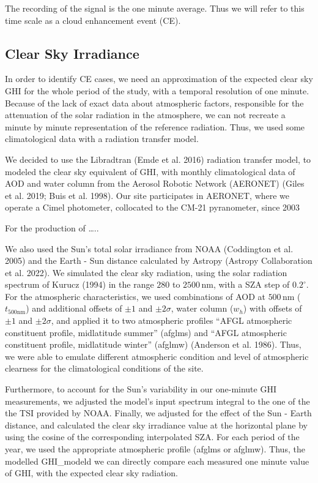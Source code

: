 \documentclass[
]{article}
\begin{document}
The recording of the signal is the one minute average.
Thus we will refer to this time scale as a cloud enhancement event (CE).

\hypertarget{clear-sky-irradiance}{%
\subsection{Clear Sky Irradiance}\label{clear-sky-irradiance}}

In order to identify CE cases, we need an approximation of the expected clear sky GHI
for the whole period of the study, with a temporal resolution of one minute. Because
of the lack of exact data about atmospheric factors, responsible for the attenuation
of the solar radiation in the atmosphere, we can not recreate a minute by minute
representation of the reference radiation. Thus, we used some climatological data
with a radiation transfer model.

We decided to use the Libradtran (Emde et al. 2016) radiation transfer model, to modeled
the clear sky equivalent of GHI, with monthly climatological data of AOD and water
column from the Aerosol Robotic Network (AERONET) (Giles et al. 2019; Buis et al. 1998). Our site
participates in AERONET, where we operate a Cimel photometer, collocated to
the CM-21 pyranometer, since 2003

For the production of \ldots..

We also used the Sun's total solar irradiance from NOAA (Coddington et al. 2005) and the
Earth - Sun distance calculated by Astropy (Astropy Collaboration et al. 2022). We simulated
the clear sky radiation, using the solar radiation spectrum of Kurucz (1994) in the
range \(280\) to \(2500\,\text{nm}\), with a SZA step of \(0.2^\circ\). For the
atmospheric characteristics, we used combinations of AOD at \(500\,\text{nm}\)
(\(t_{500\text{nm}}\)) and additional offsets of \(\pm1\) and \(\pm2\sigma\), water column
(\(w_h\)) with offsets of \(\pm1\) and \(\pm2\sigma\), and applied it to two atmospheric
profiles ``AFGL atmospheric constituent profile, midlatitude summer'' (afglms) and
``AFGL atmospheric constituent profile, midlatitude winter'' (afglmw) (Anderson et al. 1986).
Thus, we were able to emulate different atmospheric condition and level of
atmospheric clearness for the climatological conditions of the site.

Furthermore, to account for the Sun's variability in our one-minute GHI measurements,
we adjusted the model's input spectrum integral to the one of the the TSI provided by
NOAA. Finally, we adjusted for the effect of the Sun - Earth distance, and
calculated the clear sky irradiance value at the horizontal plane by using the cosine
of the corresponding interpolated SZA. For each period of the year, we used the
appropriate atmospheric profile (afglms or afglmw). Thus, the modelled GHI\_modeld we
can directly compare each measured one minute value of GHI, with the expected clear
sky radiation.
\end{document}
